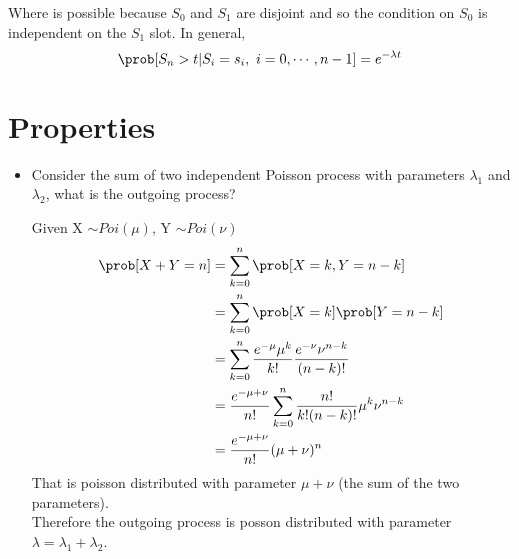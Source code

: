 Where  is possible because $S_0$ and $S_1$ are disjoint and so the condition on $S_0$ is independent on the $S_1$ slot.
In general,
\begin{equation}
	\prob[S_n > t | S_i = s_i, ~i=0,\cdots,n-1] = e^{-\lambda t}
\end{equation}

\section{Properties}
\begin{itemize}
  \item Consider the sum of two independent Poisson process with parameters $\lambda_1$ and $\lambda_2$, what is the outgoing process?
        \begin{figure}[H]
          \centering
        \end{figure}
          Given X $\sim Poi(\mu)$, Y $\sim Poi(\nu)$
          \begin{equation}
            \begin{split}
  	           \prob[X + Y = n] &=  \sum\limits_{k=0}^n \prob[X = k, Y = n - k] \\
               &=  \sum\limits_{k=0}^n \prob[X = k] \prob[Y = n - k] \\
               &=  \sum\limits_{k=0}^n \frac{e^{-\mu} \mu^k}{k!} \frac{e^{-\nu}\nu^{n-k}}{(n-k)!}\\
               &=  \frac{e^{-\mu + \nu}}{n!}\sum\limits_{k=0}^n \frac{n!}{k!(n-k)!}\mu^k\nu^{n-k}\\
               &=  \frac{e^{-\mu + \nu}}{n!}(\mu + \nu)^n
             \end{split}
           \end{equation}
           That is poisson distributed with parameter $\mu + \nu$ (the sum of the two parameters). \\
           Therefore the outgoing process is posson distributed with parameter $\lambda = \lambda_1 + \lambda_2$.

\end{itemize}
